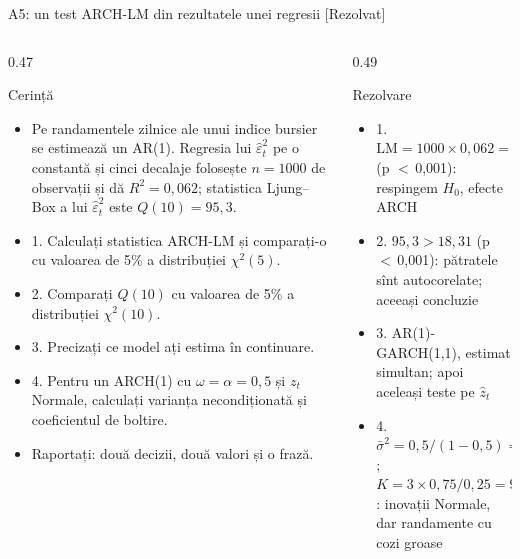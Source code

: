 \begin{frame}{A5: un test ARCH-LM din rezultatele unei regresii [Rezolvat]}
\itemsize{\scriptsize}
\begin{columns}[T]
\begin{column}{0.47\textwidth}
\begin{block}{Cerință}
\begin{itemize}
    \item Pe randamentele zilnice ale unui indice bursier se estimează un AR(1). Regresia lui $\hat\varepsilon_t^2$ pe o constantă și cinci decalaje folosește $n = 1000$ de observații și dă $R^2 = 0{,}062$; statistica Ljung--Box a lui $\hat\varepsilon_t^2$ este $Q(10) = 95{,}3$.
    \item 1. Calculați statistica ARCH-LM și comparați-o cu valoarea de 5\% a distribuției $\chi^2(5)$.
    \item 2. Comparați $Q(10)$ cu valoarea de 5\% a distribuției $\chi^2(10)$.
    \item 3. Precizați ce model ați estima în continuare.
    \item 4. Pentru un ARCH(1) cu $\omega = \alpha = 0{,}5$ și $z_t$ Normale, calculați varianța necondiționată și coeficientul de boltire.
    \item Raportați: două decizii, două valori și o frază.
\end{itemize}
\end{block}
\end{column}
\begin{column}{0.49\textwidth}
\begin{exampleblock}{Rezolvare}
\begin{itemize}
    \item 1. $\mathrm{LM} = 1000 \times 0{,}062 = 62{,}0 > 11{,}07$ (p $<$\,0{,}001): respingem $H_0$, efecte ARCH
    \item 2. $95{,}3 > 18{,}31$ (p $<$\,0{,}001): pătratele sînt autocorelate; aceeași concluzie
    \item 3. AR(1)-GARCH(1,1), estimat simultan; apoi aceleași teste pe $\hat z_t$
    \item 4. $\bar\sigma^2 = 0{,}5/(1 - 0{,}5) = 1{,}0$; $K = 3 \times 0{,}75/0{,}25 = 9{,}0$: inovații Normale, dar randamente cu cozi groase
\end{itemize}
\end{exampleblock}
\end{column}
\end{columns}
\end{frame}

